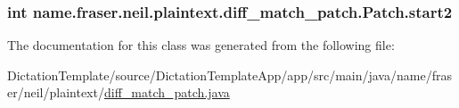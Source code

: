 \subsubsection[{\texorpdfstring{start2}{start2}}]{\setlength{\rightskip}{0pt plus 5cm}int name.\+fraser.\+neil.\+plaintext.\+diff\+\_\+match\+\_\+patch.\+Patch.\+start2}\hypertarget{classname_1_1fraser_1_1neil_1_1plaintext_1_1diff__match__patch_1_1Patch_a3b9d1c37a8620c995ca00fffd615954f}{}\label{classname_1_1fraser_1_1neil_1_1plaintext_1_1diff__match__patch_1_1Patch_a3b9d1c37a8620c995ca00fffd615954f}


The documentation for this class was generated from the following file\+:\begin{DoxyCompactItemize}
\item 
Dictation\+Template/source/\+Dictation\+Template\+App/app/src/main/java/name/fraser/neil/plaintext/\hyperlink{diff__match__patch_8java}{diff\+\_\+match\+\_\+patch.\+java}\end{DoxyCompactItemize}
